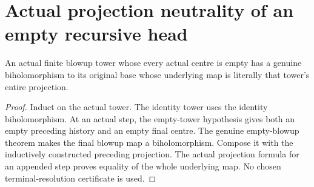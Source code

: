 \section{Actual projection neutrality of an empty recursive head}

\begin{lemma}
\label{hir:original-all-empty-tower-projection}
\leanok
An actual finite blowup tower whose every actual centre is empty has a
genuine biholomorphism to its original base whose underlying map is
literally that tower's entire projection.
\end{lemma}
\begin{proof}
Induct on the actual tower. The identity tower uses the identity
biholomorphism. At an actual step, the empty-tower hypothesis gives
both an empty preceding history and an empty final centre. The genuine
empty-blowup theorem makes the final blowup map a biholomorphism.
Compose it with the inductively constructed preceding projection.
The actual projection formula for an appended step proves equality
of the whole underlying map. No chosen terminal-resolution certificate
is used.
\end{proof}

